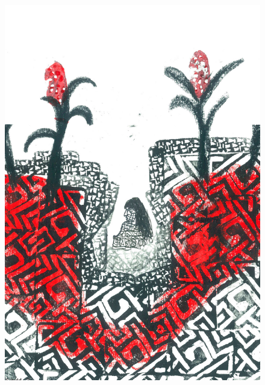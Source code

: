 \pagebreak
\thispagestyle{empty}
\begin{figure}
\vspace*{-.5cm}
\hspace*{-2.2cm}\includegraphics[width=138mm]{./imgs/img1.pdf}
\end{figure}

\chapter*{}

\mbox{}\vspace*{\fill}


